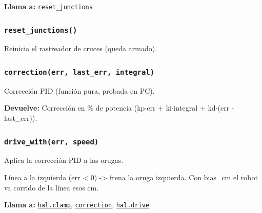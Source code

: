 \noindent\textbf{Llama a:} \hyperref[fn:linefollow:reset-junctions]{\texttt{reset\_\allowbreak{}junctions}}\par

\subsubsection{\texttt{reset\_\allowbreak{}junctions()}}\label{fn:linefollow:reset-junctions}
\noindent Reinicia el rastreador de cruces (queda armado).


\subsubsection{\texttt{correction(err, last\_\allowbreak{}err, integral)}}\label{fn:linefollow:correction}
\noindent Corrección PID (función pura, probada en PC).

\par{}\par\smallskip
\noindent\textbf{Devuelve:} Corrección en \% de potencia (kp\(\cdot\)err + ki\(\cdot\)integral + kd\(\cdot\)(err - last\_err)).\par

\subsubsection{\texttt{drive\_\allowbreak{}with(err, speed)}}\label{fn:linefollow:drive-with}
\noindent Aplica la corrección PID a las orugas.

Línea a la izquierda (err < 0) -> frena la oruga izquierda. Con bias\_cm el robot va corrido de la línea esos cm.

\par{}\par\smallskip
\noindent\textbf{Llama a:} \hyperref[fn:hal:clamp]{\texttt{hal.clamp}}, \hyperref[fn:linefollow:correction]{\texttt{correction}}, \hyperref[fn:hal:drive]{\texttt{hal.drive}}\par

